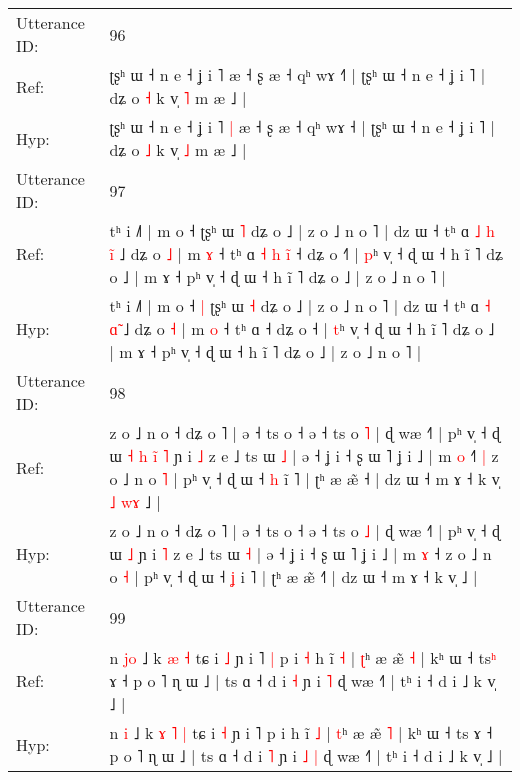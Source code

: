 \documentclass[10pt]{article}
\DeclareRobustCommand{\hl}[1]{{\textcolor{red}{#1}}}
\begin{document}
\begin{longtable}{ll}
 \\
\midrule
Utterance ID: & 96 \\
Ref: & ʈʂʰ ɯ ˧ n e ˧ ʝ i ˥\hl{}\hl{} æ ˧ ʂ æ ˧ qʰ wɤ ˧\hl{˥} | ʈʂʰ ɯ ˧ n e ˧ ʝ i ˥ | dʑ o \hl{˧} k v̩ \hl{˥} m æ ˩ |
 \\
Hyp: & ʈʂʰ ɯ ˧ n e ˧ ʝ i ˥\hl{ }\hl{|} æ ˧ ʂ æ ˧ qʰ wɤ ˧\hl{} | ʈʂʰ ɯ ˧ n e ˧ ʝ i ˥ | dʑ o \hl{˩} k v̩ \hl{˩} m æ ˩ |
 \\
\midrule
Utterance ID: & 97 \\
Ref: & tʰ i ˩˥ | m o ˧\hl{}\hl{} ʈʂʰ ɯ \hl{˥} dʑ o ˩ | z o ˩ n o ˥ | dz ɯ ˧ tʰ ɑ\hl{ }\hl{˩} \hl{h} \hl{i}̃ ˩ dʑ o \hl{˩} | m \hl{ɤ} ˧ tʰ ɑ\hl{ }\hl{˧}\hl{ }\hl{h}\hl{ }\hl{i}\hl{̃} ˧ dʑ o ˧\hl{˥} | \hl{p}ʰ v̩ ˧ ɖ ɯ ˧ h ĩ ˥ dʑ o ˩ | m ɤ ˧ pʰ v̩ ˧ ɖ ɯ ˧ h ĩ ˥ dʑ o ˩ | z o ˩ n o ˥ |
 \\
Hyp: & tʰ i ˩˥ | m o ˧\hl{ }\hl{|} ʈʂʰ ɯ \hl{˧} dʑ o ˩ | z o ˩ n o ˥ | dz ɯ ˧ tʰ ɑ\hl{}\hl{} \hl{˧} \hl{ɑ}̃ ˩ dʑ o \hl{˧} | m \hl{o} ˧ tʰ ɑ\hl{}\hl{}\hl{}\hl{}\hl{}\hl{}\hl{} ˧ dʑ o ˧\hl{} | \hl{t}ʰ v̩ ˧ ɖ ɯ ˧ h ĩ ˥ dʑ o ˩ | m ɤ ˧ pʰ v̩ ˧ ɖ ɯ ˧ h ĩ ˥ dʑ o ˩ | z o ˩ n o ˥ |
 \\
\midrule
Utterance ID: & 98 \\
Ref: & z o ˩ n o ˧ dʑ o ˥ | ə ˧ ts o ˧ ə ˧ ts o \hl{˥} | ɖ wæ ˧˥ | pʰ v̩ ˧ ɖ ɯ\hl{ }\hl{˧}\hl{ }\hl{h}\hl{ }\hl{i}\hl{̃} \hl{˥} ɲ i \hl{˩} z e ˩ ts ɯ \hl{˩} | ə ˧ ʝ i ˧ ʂ ɯ ˥ ʝ i ˩ | m \hl{o} ˧\hl{˥}\hl{ }\hl{|} z o ˩ n o \hl{˥} | pʰ v̩ ˧ ɖ ɯ ˧ \hl{h} i\hl{̃} ˥ | ʈʰ æ æ̃ ˧\hl{} | dz ɯ ˧ m ɤ ˧ k v̩\hl{ }\hl{˩}\hl{ }\hl{w}\hl{ɤ} ˩ |
 \\
Hyp: & z o ˩ n o ˧ dʑ o ˥ | ə ˧ ts o ˧ ə ˧ ts o \hl{˩} | ɖ wæ ˧˥ | pʰ v̩ ˧ ɖ ɯ\hl{}\hl{}\hl{}\hl{}\hl{}\hl{}\hl{} \hl{˩} ɲ i \hl{˥} z e ˩ ts ɯ \hl{˧} | ə ˧ ʝ i ˧ ʂ ɯ ˥ ʝ i ˩ | m \hl{ɤ} ˧\hl{}\hl{}\hl{} z o ˩ n o \hl{˧} | pʰ v̩ ˧ ɖ ɯ ˧ \hl{ʝ} i\hl{} ˥ | ʈʰ æ æ̃ ˧\hl{˥} | dz ɯ ˧ m ɤ ˧ k v̩\hl{}\hl{}\hl{}\hl{}\hl{} ˩ |
 \\
\midrule
Utterance ID: & 99 \\
Ref: & n \hl{j}\hl{o} ˩ k\hl{}\hl{} \hl{æ} \hl{˧} tɕ i \hl{˩} ɲ i ˥\hl{ }\hl{|} p i\hl{ }\hl{˧} h ĩ \hl{˧} | \hl{ʈ}ʰ æ æ̃ \hl{˧} | kʰ ɯ ˧ ts\hl{ʰ} ɤ ˧ p o ˥ ɳ ɯ ˩ | ts ɑ ˧ d i \hl{˧} ɲ i\hl{}\hl{} \hl{˥} ɖ wæ ˧˥ | tʰ i ˧ d i ˩ k v̩ ˩ |
 \\
Hyp: & n \hl{}\hl{i} ˩ k\hl{ }\hl{ɤ} \hl{˥} \hl{|} tɕ i \hl{˧} ɲ i ˥\hl{}\hl{} p i\hl{}\hl{} h ĩ \hl{˩} | \hl{t}ʰ æ æ̃ \hl{˥} | kʰ ɯ ˧ ts\hl{} ɤ ˧ p o ˥ ɳ ɯ ˩ | ts ɑ ˧ d i \hl{˥} ɲ i\hl{ }\hl{˩} \hl{|} ɖ wæ ˧˥ | tʰ i ˧ d i ˩ k v̩ ˩ |
 \\
\midrule

\end{longtable}
\end{document}
